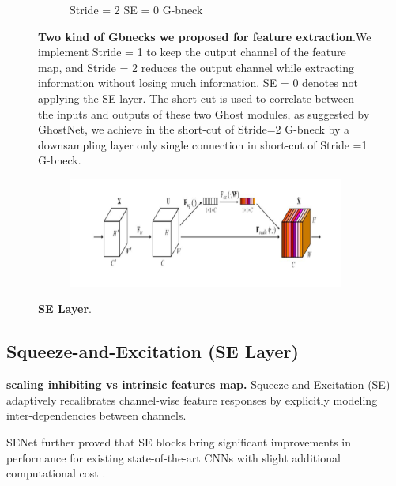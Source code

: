 \begin{figure}[h]
\begin{center}
\begin{subfigure}[b]{0.49\textwidth}
			\caption{Stride = 2 SE = 0 G-bneck}
			\label{fig:cellnet}
		\end{subfigure}
	\end{center}
	\caption{\textbf{Two kind of Gbnecks we proposed for feature extraction}.We implement Stride = 1 to keep the output channel of the feature map, and Stride = 2 reduces the output channel while extracting information without losing much information. SE = 0 denotes not applying the SE layer.  The short-cut is used to correlate between the inputs and outputs of these two Ghost modules, as suggested by GhostNet, we achieve in the short-cut of Stride=2 G-bneck by a downsampling layer only single connection in short-cut of Stride =1 G-bneck.}
\end{figure}

\begin{figure}[h]
	\begin{center}
		\begin{subfigure}[b]{\textwidth}
		    \centering
			\includegraphics[width=\textwidth]{thesis-template-master/images/SElayer.png}
			\label{fig:cellnet}
		\end{subfigure}
	\end{center}
	\caption{\textbf{SE Layer}.}
\end{figure}

\subsection{Squeeze-and-Excitation (SE Layer)} %
\label{sub:amet}

\textbf{scaling inhibiting vs intrinsic features map.} Squeeze-and-Excitation (SE)\cite{24} adaptively recalibrates channel-wise feature responses by explicitly modeling inter-dependencies between channels.

SENet further proved that SE blocks bring significant improvements in performance for existing state-of-the-art CNNs with slight additional computational cost \cite{24}. 



